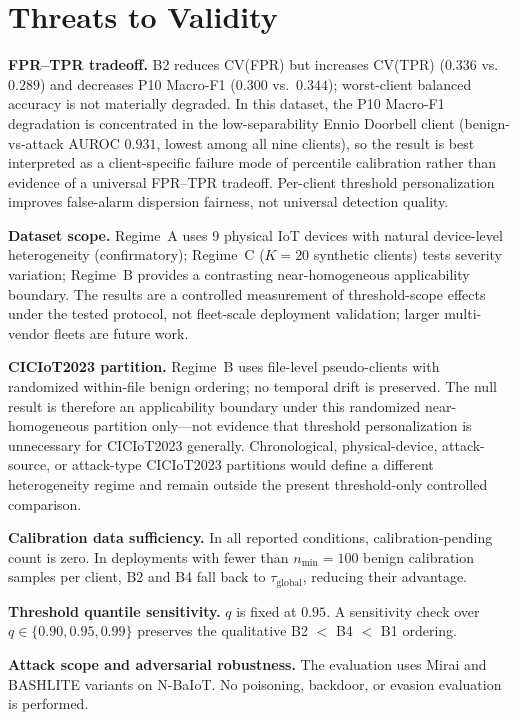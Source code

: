 \section{Threats to Validity}
\label{sec:threats}

\textbf{FPR--TPR tradeoff.}
B2 reduces CV(FPR) but increases CV(TPR) ($0.336$ vs.\ $0.289$) and decreases P10 Macro-F1
($0.300$ vs.\ $0.344$); worst-client balanced accuracy is not materially degraded.
In this dataset, the P10 Macro-F1 degradation is concentrated in the low-separability
Ennio Doorbell client (benign-vs-attack AUROC $0.931$, lowest among all nine clients),
so the result is best interpreted as a client-specific failure mode of percentile
calibration rather than evidence of a universal FPR--TPR tradeoff.
Per-client threshold personalization improves false-alarm dispersion fairness, not universal detection quality.

\textbf{Dataset scope.}
Regime~A uses 9 physical IoT devices with natural device-level heterogeneity
(confirmatory); Regime~C ($K{=}20$ synthetic clients) tests severity variation;
Regime~B provides a contrasting near-homogeneous applicability boundary.
The results are a controlled measurement of threshold-scope effects under the tested
protocol, not fleet-scale deployment validation; larger multi-vendor fleets are future work.

\textbf{CICIoT2023 partition.}
Regime~B uses file-level pseudo-clients with randomized within-file benign ordering;
no temporal drift is preserved.
The null result is therefore an applicability boundary under this randomized near-homogeneous
partition only---not evidence that threshold personalization is unnecessary for CICIoT2023
generally.
Chronological, physical-device, attack-source, or attack-type CICIoT2023 partitions would define a different heterogeneity regime and remain outside the present threshold-only controlled comparison.

\textbf{Calibration data sufficiency.}
In all reported conditions, calibration-pending count is zero.
In deployments with fewer than $n_{\min}=100$ benign calibration samples per client,
B2 and B4 fall back to $\tau_{\text{global}}$, reducing their advantage.

\textbf{Threshold quantile sensitivity.}
$q$ is fixed at $0.95$. A sensitivity check over $q \in \{0.90, 0.95, 0.99\}$
preserves the qualitative B2 $<$ B4 $<$ B1 ordering.

\textbf{Attack scope and adversarial robustness.}
The evaluation uses Mirai and BASHLITE variants on N-BaIoT.
No poisoning, backdoor, or evasion evaluation is performed.

